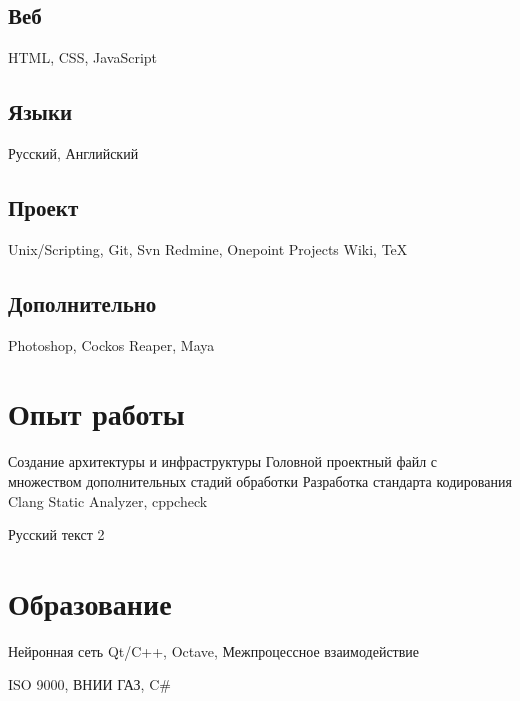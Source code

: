 \documentclass[a4paper]{curricula-vitae}
\begin{document}
\begin{minipage}[t]{0.33\textwidth}
\subsection{Веб}
HTML, CSS, JavaScript

\subsection{Языки}
Русский, Английский

\subsection{Проект}
Unix/Scripting, Git, Svn
Redmine, Onepoint Projects
Wiki, TeX

\subsection{Дополнительно}
Photoshop, 
Cockos Reaper, 
Maya

\end{minipage} %
\hfill
\begin{minipage}[t]{0.66\textwidth} %

\section{Опыт работы} 

Создание архитектуры и инфраструктуры
Головной проектный файл с множеством дополнительных стадий обработки
Разработка стандарта кодирования
Clang Static Analyzer, cppcheck

Русский текст 2

\section{Образование} 

Нейронная сеть Qt/C++, Octave, Межпроцессное взаимодействие

ISO 9000, ВНИИ ГАЗ, C\#

\end{minipage} %

\end{document}
